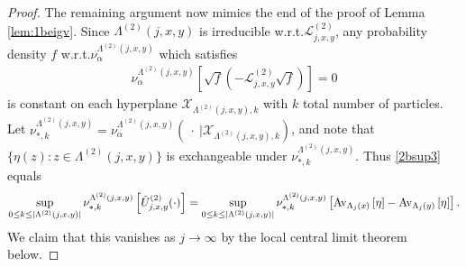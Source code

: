 \documentclass[11pt]{amsart}
\theoremstyle{plain}
\theoremstyle{definition}
\theoremstyle{remark}
\newcommand{\Utildetwo}[3]{\tilde{U}^{(2)}_{{#1},{#2},{#3}}}
\newcommand{\avg}[2]{{\rm Av}_{#2}\left[{#1}\right]}
\begin{document}
\begin{proof}
The remaining argument now mimics the end of the proof of Lemma \ref{lem:1beigv}. Since $\Lambda^{(2)}(j,x,y)$ is irreducible w.r.t.\@ $\mathcal{L}^{(2)}_{j,x,y}$, any probability density $f$ w.r.t.\@ $\nu_\alpha^{\Lambda^{(2)}(j,x,y)}$ which satisfies 
\begin{align*}
\nu_\alpha^{\Lambda^{(2)}(j,x,y)}\left[\sqrt{f}\left(-\mathcal{L}^{(2)}_{j,x,y} \sqrt{f}\right)\right]=0
\end{align*}
is constant on each hyperplane $\mathcal{X}_{\Lambda^{(2)}(j,x,y),k}$ with $k$ total number of particles. Let $\nu^{\Lambda^{(2)}(j,x,y)}_{*,k} = \nu^{\Lambda^{(2)}(j,x,y)}_\alpha\left(~\cdot~|\mathcal{X}_{\Lambda^{(2)}(j,x,y),k}\right)$, and note that $\{\eta(z): z\in \Lambda^{(2)}(j,x,y)\}$ is exchangeable under $\nu^{\Lambda^{(2)}(j,x,y)}_{*,k}$. Thus \eqref{2bsup3} equals
\begin{align}
\sup_{0\leq k\leq |\Lambda^{(2)}(j,x,y)|} \nu^{\Lambda^{(2)}(j,x,y)}_{*,k} \left[\Utildetwo{j}{x}{y}(\cdot)\right] = \sup_{0\leq k \leq |\Lambda^{(2)}(j,x,y)|} \nu^{\Lambda^{(2)}(j,x,y)}_{*,k}  \left[\avg{\eta}{\Lambda_j(x)}- \avg{\eta}{\Lambda_j(y)}\right].
\end{align}
We claim that this vanishes as $j\to\infty$ by the local central limit theorem below.
\end{proof}
\end{document}
